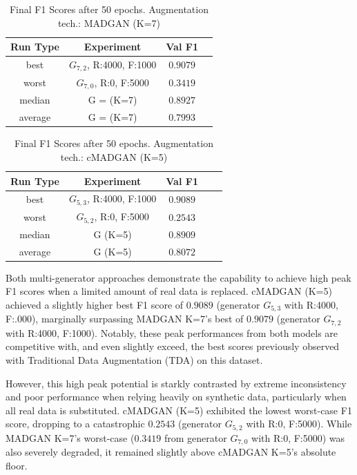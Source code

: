 \begin{table}[H]
	\vspace{-1.5em}
	\centering
	\begin{tabular}{|c|c|c|c|}
		\hline
		Run Type & Experiment & Val F1 \\ \hline
		best & \(G_{7, 2}\), R:4000, F:1000 & $0.9079$\\ \hline
		worst & \(G_{7, 0}\), R:0, F:5000 & $0.3419$\\ \hline
		median & G = (K=7) & $0.8927$\\ \hline
		average & G = (K=7) & $0.7993$
		\\ \hline
	\end{tabular}
    \caption{Final F1 Scores after 50 epochs. Augmentation tech.: MADGAN (K=7)}
        \label{tab:res_replacement_fashion_cmadgan_vs_madgan__madgan}
\end{table}
\begin{table}[H]
	\centering
	\vspace{-1.5em}
	\begin{tabular}{|c|c|c|c|c|}
		\hline
		Run Type & Experiment & Val F1 \\ \hline
		best & \(G_{5, 3}\), R:4000, F:1000 & $0.9089$\\ \hline
		worst & \(G_{5, 2}\), R:0, F:5000 & $0.2543$\\ \hline
		median & G (K=5) & $0.8909$\\ \hline
		average & G (K=5) & $0.8072$
		\\ \hline
	\end{tabular}
    \caption{Final F1 Scores after 50 epochs. Augmentation tech.: cMADGAN (K=5)}
        \label{tab:res_replacement_fashion_cmadgan_vs_madgan__cmadgan}
\end{table}

Both multi-generator approaches demonstrate the capability to achieve high peak F1 scores when a limited amount of real data is replaced. cMADGAN (K=5) achieved a slightly higher best F1 score of $0.9089$ (generator \(G_{5,3}\) with R:4000, F:.000), marginally surpassing MADGAN K=7's best of $0.9079$ (generator \(G_{7,2}\) with R:4000, F:1000). Notably, these peak performances from both models are competitive with, and even slightly exceed, the best scores previously observed with Traditional Data Augmentation (TDA) on this dataset.

However, this high peak potential is starkly contrasted by extreme inconsistency and poor performance when relying heavily on synthetic data, particularly when all real data is substituted. cMADGAN (K=5) exhibited the lowest worst-case F1 score, dropping to a catastrophic $0.2543$ (generator \(G_{5,2}\) with R:0, F:5000). While MADGAN K=7's worst-case ($0.3419$ from generator \(G_{7,0}\) with R:0, F:5000) was also severely degraded, it remained slightly above cMADGAN K=5's absolute floor.

